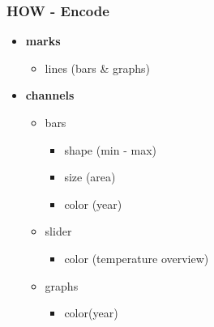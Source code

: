 \documentclass{beamer}
\begin{document}
  \begin{frame}
  \frametitle{HOW - Encode}
    \begin{itemize}
      \item \textbf{marks}
	\begin{itemize}
	  \item lines (bars \& graphs)
	\end{itemize}
      \item \textbf{channels}
	\begin{itemize}
	  \item bars
	  \begin{itemize}
	   \item shape (min - max)
	   \item size (area)
	   \item color (year)
	  \end{itemize}
	  \item slider
	  \begin{itemize}
	   \item color (temperature overview)
	  \end{itemize}
	  \item graphs
	  \begin{itemize}
	   \item color(year)
	  \end{itemize}
	\end{itemize}
    \end{itemize}
  \end{frame}
  
\end{document}
